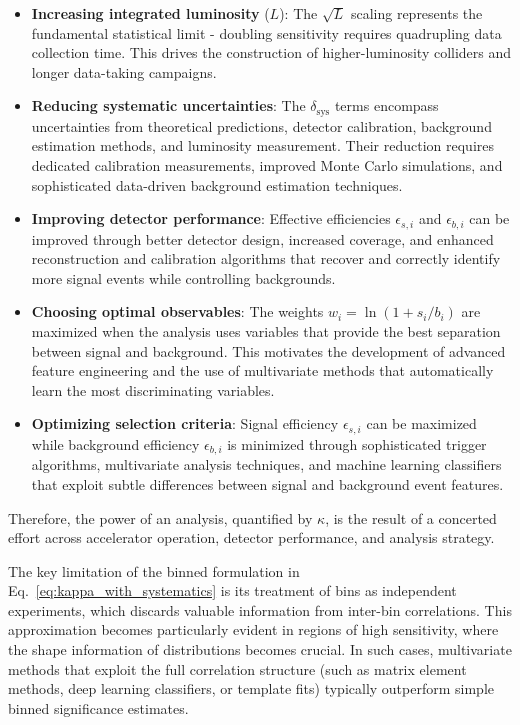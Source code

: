 \begin{itemize}
    \item \textbf{Increasing integrated luminosity} ($L$): The $\sqrt{L}$ scaling represents the fundamental statistical limit - doubling sensitivity requires quadrupling data collection time. This drives the construction of higher-luminosity colliders and longer data-taking campaigns.
    
    \item \textbf{Reducing systematic uncertainties}: The $\delta_{\text{sys}}$ terms encompass uncertainties from theoretical predictions, detector calibration, background estimation methods, and luminosity measurement. Their reduction requires dedicated calibration measurements, improved Monte Carlo simulations, and sophisticated data-driven background estimation techniques.

		\item \textbf{Improving detector performance}: Effective efficiencies $\epsilon_{s,i}$ and $\epsilon_{b,i}$ can be improved through better detector design, increased coverage, and enhanced reconstruction and calibration algorithms that recover and correctly identify more signal events while controlling backgrounds.

    \item \textbf{Choosing optimal observables}: The weights $w_i = \ln(1 + s_i/b_i)$ are maximized when the analysis uses variables that provide the best separation between signal and background. This motivates the development of advanced feature engineering and the use of multivariate methods that automatically learn the most discriminating variables.

    \item \textbf{Optimizing selection criteria}: Signal efficiency $\epsilon_{s,i}$ can be maximized while background efficiency $\epsilon_{b,i}$ is minimized through sophisticated trigger algorithms, multivariate analysis techniques, and machine learning classifiers that exploit subtle differences between signal and background event features.

\end{itemize}

Therefore, the power of an analysis, quantified by $\kappa$, is the result of a concerted effort across accelerator operation, detector performance, and analysis strategy.

The key limitation of the binned formulation in Eq.~\ref{eq:kappa_with_systematics} is its treatment of bins as independent experiments, which discards valuable information from inter-bin correlations. This approximation becomes particularly evident in regions of high sensitivity, where the shape information of distributions becomes crucial. In such cases, multivariate methods that exploit the full correlation structure (such as matrix element methods, deep learning classifiers, or template fits) typically outperform simple binned significance estimates.

